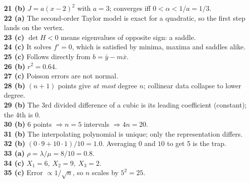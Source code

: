 \begin{mcqbox}
\textbf{21 (b)} $J = a(x-2)^2$ with $a=3$; converges iff $0<\alpha<1/a = 1/3$.\\
\textbf{22 (a)} The second-order Taylor model is exact for a quadratic, so the first step lands on the vertex.\\
\textbf{23 (c)} $\det H<0$ means eigenvalues of opposite sign: a saddle.\\
\textbf{24 (c)} It solves $f'=0$, which is satisfied by minima, maxima and saddles alike.\\
\textbf{25 (c)} Follows directly from $b = \bar y - m\bar x$.\\
\textbf{26 (b)} $r^2 = 0.64$.\\
\textbf{27 (c)} Poisson errors are not normal.\\
\textbf{28 (b)} $(n+1)$ points give \emph{at most} degree $n$; collinear data collapse to lower degree.\\
\textbf{29 (b)} The 3rd divided difference of a cubic is its leading coefficient (constant); the 4th is 0.\\
\textbf{30 (b)} 6 points $\Rightarrow n=5$ intervals $\Rightarrow 4n = 20$.\\
\textbf{31 (b)} The interpolating polynomial is unique; only the representation differs.\\
\textbf{32 (b)} $(0\cdot9 + 10\cdot1)/10 = 1.0$. Averaging $0$ and $10$ to get 5 is the trap.\\
\textbf{33 (a)} $\rho = \lambda/\mu = 8/10 = 0.8$.\\
\textbf{34 (c)} $X_1=6,\ X_2=9,\ X_3=2$.\\
\textbf{35 (c)} Error $\propto 1/\sqrt n$, so $n$ scales by $5^2 = 25$.
\end{mcqbox}

